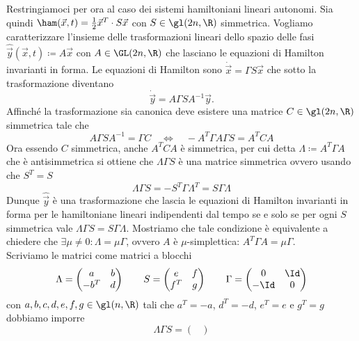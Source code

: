\begin{example} \label{es:ham-quadratica-canoniche}
    Restringiamoci per ora al caso dei sistemi hamiltoniani lineari autonomi. Sia quindi $ \ham(\vec{x}, t) = \frac{1}{2} \vec{x}^T \cdot S \vec{x} $ con $ S \in \gl(2n, \R) $ simmetrica. Vogliamo caratterizzare l'insieme delle trasformazioni lineari dello spazio delle fasi $ \hat{\vec{y}}(\vec{x}, t) \coloneqq A \vec{x} $ con $ A \in \GL(2n, \R) $ che lasciano le equazioni di Hamilton invarianti in forma. Le equazioni di Hamilton sono $ \dot{\vec{x}} = \Gamma S \vec{x} $ che sotto la trasformazione diventano
    \[
        \dot{\vec{y}} = A \Gamma S A^{-1} \vec{y}.
    \]
    Affinché la trasformazione sia canonica deve esistere una matrice $ C \in \gl(2n, \R) $ simmetrica tale che
    \[
        A \Gamma S A^{-1} = \Gamma C \quad \iff \quad - A^T \Gamma A \Gamma S = A^T C A
    \]
    Ora essendo $ C $ simmetrica, anche $ A^T C A $ è simmetrica, per cui detta $ \Lambda \coloneqq A^T \Gamma A $ che è antisimmetrica si ottiene che $ \Lambda \Gamma S $ è una matrice simmetrica ovvero usando che $ S^T = S $
    \[
        \Lambda \Gamma S = - S^T \Gamma \Lambda^T = S \Gamma \Lambda
    \]
    Dunque $ \hat{\vec{y}} $ è una trasformazione che lascia le equazioni di Hamilton invarianti in forma per le hamiltoniane lineari indipendenti dal tempo se e solo se per ogni $ S $ simmetrica vale $ \Lambda \Gamma S = S \Gamma \Lambda $. Mostriamo che tale condizione è equivalente a chiedere che $ \exists \mu \neq 0  : \Lambda = \mu \Gamma $, ovvero $ A $ è $ \mu $-simplettica: $ A^T \Gamma A = \mu \Gamma $. \\
    Scriviamo le matrici come matrici a blocchi
    \[
        \Lambda =
        \begin{pmatrix}
            a & b \\
            -b^T & d
        \end{pmatrix}
        \qquad
        S =
        \begin{pmatrix}
            e & f \\
            f^T & g
        \end{pmatrix}
        \qquad
        \Gamma =
        \begin{pmatrix}
        0 & \Id \\
        -\Id & 0
        \end{pmatrix}
    \]
    con $ a, b, c, d, e, f, g \in \gl(n, \R) $ tali che $ a^T = -a $, $ d^T = -d $, $ e^T = e $ e $ g^T = g $ dobbiamo imporre
    \[
        \Lambda \Gamma S =
        \begin{pmatrix}

\end{pmatrix}\]
\end{example}
